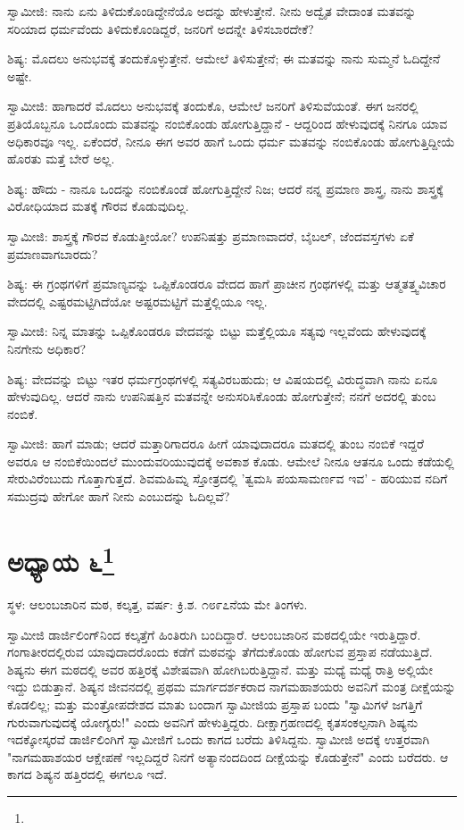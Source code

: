 ಸ್ವಾಮೀಜಿ: ನಾನು ಏನು ತಿಳಿದುಕೊಂಡಿದ್ದೇನೆಯೊ ಅದನ್ನು ಹೇಳುತ್ತೇನೆ. ನೀನು ಅದ್ವೈತ ವೇದಾಂತ ಮತವನ್ನು ಸರಿಯಾದ ಧರ್ಮವೆಂದು ತಿಳಿದುಕೊಂಡಿದ್ದರೆ, ಜನರಿಗೆ ಅದನ್ನೇ ತಿಳಿಸಬಾರದೇಕೆ?

ಶಿಷ್ಯ: ಮೊದಲು ಅನುಭವಕ್ಕೆ ತಂದುಕೊಳ್ಳುತ್ತೇನೆ. ಆಮೇಲೆ ತಿಳಿಸುತ್ತೇನೆ; ಈ ಮತವನ್ನು ನಾನು ಸುಮ್ಮನೆ ಓದಿದ್ದೇನೆ ಅಷ್ಟೇ.

ಸ್ವಾಮೀಜಿ: ಹಾಗಾದರೆ ಮೊದಲು ಅನುಭವಕ್ಕೆ ತಂದುಕೊ, ಆಮೇಲೆ ಜನರಿಗೆ ತಿಳಿಸುವೆಯಂತೆ. ಈಗ ಜನರಲ್ಲಿ ಪ್ರತಿಯೊಬ್ಬನೂ ಒಂದೊಂದು ಮತವನ್ನು ನಂಬಿಕೊಂಡು ಹೋಗುತ್ತಿದ್ದಾನೆ - ಆದ್ದರಿಂದ ಹೇಳುವುದಕ್ಕೆ ನಿನಗೂ ಯಾವ ಅಧಿಕಾರವೂ ಇಲ್ಲ. ಏಕೆಂದರೆ, ನೀನೂ ಈಗ ಅವರ ಹಾಗೆ ಒಂದು ಧರ್ಮ ಮತವನ್ನು ನಂಬಿಕೊಂಡು ಹೋಗುತ್ತಿದ್ದೀಯೆ ಹೊರತು ಮತ್ತೆ ಬೇರೆ ಅಲ್ಲ.

ಶಿಷ್ಯ: ಹೌದು - ನಾನೂ ಒಂದನ್ನು ನಂಬಿಕೊಂಡೆ ಹೋಗುತ್ತಿದ್ದೇನೆ ನಿಜ; ಆದರೆ ನನ್ನ ಪ್ರಮಾಣ ಶಾಸ್ತ್ರ, ನಾನು ಶಾಸ್ತ್ರಕ್ಕೆ ವಿರೋಧಿಯಾದ ಮತಕ್ಕೆ ಗೌರವ ಕೊಡುವುದಿಲ್ಲ.

ಸ್ವಾಮೀಜಿ: ಶಾಸ್ತ್ರಕ್ಕೆ ಗೌರವ ಕೊಡುತ್ತೀಯೋ? ಉಪನಿಷತ್ತು ಪ್ರಮಾಣವಾದರೆ, ಬೈಬಲ್, ಜೆಂದವಸ್ತಗಳು ಏಕೆ ಪ್ರಮಾಣವಾಗಬಾರದು?

ಶಿಷ್ಯ: ಈ ಗ್ರಂಥಗಳಿಗೆ ಪ್ರಮಾಣ್ಯವನ್ನು ಒಪ್ಪಿಕೊಂಡರೂ ವೇದದ ಹಾಗೆ ಪ್ರಾಚೀನ ಗ್ರಂಥಗಳಲ್ಲಿ ಮತ್ತು ಆತ್ಮತತ್ತ್ವವಿಚಾರ ವೇದದಲ್ಲಿ ಎಷ್ಟರಮಟ್ಟಿಗಿದೆಯೋ ಅಷ್ಟರಮಟ್ಟಿಗೆ ಮತ್ತೆಲ್ಲಿಯೂ ಇಲ್ಲ.

ಸ್ವಾಮೀಜಿ: ನಿನ್ನ ಮಾತನ್ನು ಒಪ್ಪಿಕೊಂಡರೂ ವೇದವನ್ನು ಬಿಟ್ಟು ಮತ್ತೆಲ್ಲಿಯೂ ಸತ್ಯವು ಇಲ್ಲವೆಂದು ಹೇಳುವುದಕ್ಕೆ ನಿನಗೇನು ಅಧಿಕಾರ?

ಶಿಷ್ಯ: ವೇದವನ್ನು ಬಿಟ್ಟು ಇತರ ಧರ್ಮಗ್ರಂಥಗಳಲ್ಲಿ ಸತ್ಯವಿರಬಹುದು; ಆ ವಿಷಯದಲ್ಲಿ ವಿರುದ್ಧವಾಗಿ ನಾನು ಏನೂ ಹೇಳುವುದಿಲ್ಲ. ಆದರೆ ನಾನು ಉಪನಿಷತ್ತಿನ ಮತವನ್ನೇ ಅನುಸರಿಸಿಕೊಂಡು ಹೋಗುತ್ತೇನೆ; ನನಗೆ ಅದರಲ್ಲಿ ತುಂಬ ನಂಬಿಕೆ.

ಸ್ವಾಮೀಜಿ: ಹಾಗೆ ಮಾಡು; ಆದರೆ ಮತ್ತಾರಿಗಾದರೂ ಹೀಗೆ ಯಾವುದಾದರೂ ಮತದಲ್ಲಿ ತುಂಬ ನಂಬಿಕೆ ಇದ್ದರೆ ಅವರೂ ಆ ನಂಬಿಕೆಯಿಂದಲೆ ಮುಂದುವರಿಯುವುದಕ್ಕೆ ಅವಕಾಶ ಕೊಡು. ಆಮೇಲೆ ನೀನೂ ಆತನೂ ಒಂದು ಕಡೆಯಲ್ಲಿ ಸೇರುವಿರೆಂಬುದು ಗೊತ್ತಾಗುತ್ತದೆ. ಶಿವಮಹಿಮ್ನ ಸ್ತೋತ್ರದಲ್ಲಿ 'ತ್ವಮಸಿ ಪಯಸಾಮರ್ಣವ ಇವ' - ಹರಿಯುವ ನದಿಗೆ ಸಮುದ್ರವು ಹೇಗೋ ಹಾಗೆ ನೀನು ಎಂಬುದನ್ನು ಓದಿಲ್ಲವೆ?

\newpage

\chapter[ಅಧ್ಯಾಯ ೬]{ಅಧ್ಯಾಯ ೬\protect\footnote{}}

\begin{center}
ಸ್ಥಳ: ಆಲಂಬಜಾರಿನ ಮಠ, ಕಲ್ಕತ್ತ, ವರ್ಷ: ಕ್ರಿ.ಶ. ೧೮೯೭ನೆಯ ಮೇ ತಿಂಗಳು.
\end{center}

ಸ್ವಾಮೀಜಿ ಡಾರ್ಜಿಲಿಂಗ್‌ನಿಂದ ಕಲ್ಕತ್ತೆಗೆ ಹಿಂತಿರುಗಿ ಬಂದಿದ್ದಾರೆ. ಆಲಂಬಜಾರಿನ ಮಠದಲ್ಲಿಯೇ ಇರುತ್ತಿದ್ದಾರೆ. ಗಂಗಾತೀರದಲ್ಲಿರುವ ಯಾವುದಾದರೊಂದು ಕಡೆಗೆ ಮಠವನ್ನು ತೆಗೆದುಕೊಂಡು ಹೋಗುವ ಪ್ರಸ್ತಾಪ ನಡೆಯುತ್ತಿದೆ. ಶಿಷ್ಯನು ಈಗ ಮಠದಲ್ಲಿ ಅವರ ಹತ್ತಿರಕ್ಕೆ ವಿಶೇಷವಾಗಿ ಹೋಗಿಬರುತ್ತಿದ್ದಾನೆ. ಮತ್ತು ಮಧ್ಯೆ ಮಧ್ಯೆ ರಾತ್ರಿ ಅಲ್ಲಿಯೇ ಇದ್ದು ಬಿಡುತ್ತಾನೆ. ಶಿಷ್ಯನ ಜೀವನದಲ್ಲಿ ಪ್ರಥಮ ಮಾರ್ಗದರ್ಶಕರಾದ ನಾಗಮಹಾಶಯರು ಅವನಿಗೆ ಮಂತ್ರ ದೀಕ್ಷೆಯನ್ನು ಕೊಡಲಿಲ್ಲ; ಮತ್ತು ಮಂತ್ರೋಪದೇಶದ ಮಾತು ಬಂದಾಗ ಸ್ವಾಮೀಜಿಯ ಪ್ರಸ್ತಾಪ ಬಂದು "ಸ್ವಾಮಿಗಳೆ ಜಗತ್ತಿಗೆ ಗುರುವಾಗುವುದಕ್ಕೆ ಯೋಗ್ಯರು!" ಎಂದು ಅವನಿಗೆ ಹೇಳುತ್ತಿದ್ದರು. ದೀಕ್ಷಾಗ್ರಹಣದಲ್ಲಿ ಕೃತಸಂಕಲ್ಪನಾಗಿ ಶಿಷ್ಯನು ಇದಕ್ಕೋಸ್ಕರವೆ ಡಾರ್ಜಿಲಿಂಗಿಗೆ ಸ್ವಾಮೀಜಿಗೆ ಒಂದು ಕಾಗದ ಬರೆದು ತಿಳಿಸಿದ್ದನು. ಸ್ವಾಮೀಜಿ ಅದಕ್ಕೆ ಉತ್ತರವಾಗಿ "ನಾಗಮಹಾಶಯರ ಆಕ್ಷೇಪಣೆ ಇಲ್ಲದಿದ್ದರೆ ನಿನಗೆ ಅತ್ಯಾನಂದದಿಂದ ದೀಕ್ಷೆಯನ್ನು ಕೊಡುತ್ತೇನೆ" ಎಂದು ಬರೆದರು. ಆ ಕಾಗದ ಶಿಷ್ಯನ ಹತ್ತಿರದಲ್ಲಿ ಈಗಲೂ ಇದೆ.

